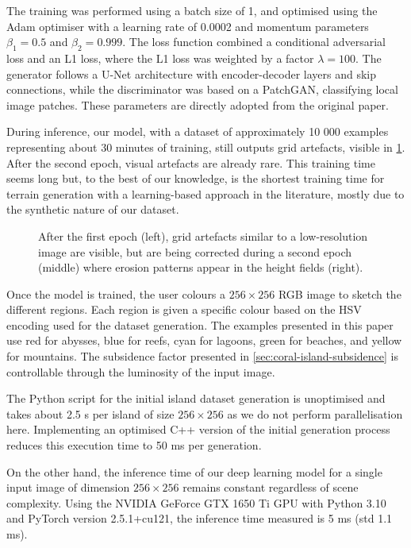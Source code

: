 The training was performed using a batch size of 1, and optimised using the Adam optimiser with a learning rate of 0.0002 and momentum parameters $\beta_1 = 0.5$ and $\beta_2 = 0.999$. The loss function combined a conditional adversarial loss and an L1 loss, where the L1 loss was weighted by a factor $\lambda = 100$. The generator follows a U-Net architecture with encoder-decoder layers and skip connections, while the discriminator was based on a PatchGAN, classifying local image patches. These parameters are directly adopted from the original paper.

During inference, our model, with a dataset of approximately 10 000 examples representing about 30 minutes of training, still outputs grid artefacts, visible in \cref{fig:coral-island-first-epoch}. After the second epoch, visual artefacts are already rare. This training time seems long but, to the best of our knowledge, is the shortest training time for terrain generation with a learning-based approach in the literature, mostly due to the synthetic nature of our dataset.

\begin{figure}[t]
\caption{After the first epoch (left), grid artefacts similar to a low-resolution image are visible, but are being corrected during a second epoch (middle) where erosion patterns appear in the height fields (right).}
\label{fig:coral-island-first-epoch}
\end{figure}

Once the model is trained, the user colours a $256\times256$ RGB image to sketch the different regions. Each region is given a specific colour based on the HSV encoding used for the dataset generation. The examples presented in this paper use red for abysses, blue for reefs, cyan for lagoons, green for beaches, and yellow for mountains. The subsidence factor presented in \cref{sec:coral-island-subsidence} is controllable through the luminosity of the input image.

The Python script for the initial island dataset generation is unoptimised and takes about 2.5 s per island of size $256 \times 256$ as we do not perform parallelisation here. Implementing an optimised C++ version of the initial generation process reduces this execution time to 50 ms per generation.

On the other hand, the inference time of our deep learning model for a single input image of dimension $256 \times 256$ remains constant regardless of scene complexity. Using the NVIDIA GeForce GTX 1650 Ti GPU with Python 3.10 and PyTorch version 2.5.1+cu121, the inference time measured is 5 ms (std 1.1 ms).

